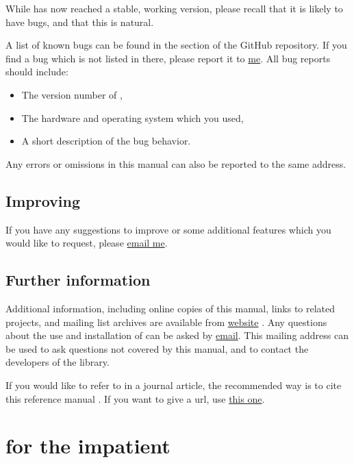 \documentclass{ol-softwaremanual}
\begin{document}
While \thel has now reached a stable, working version, please recall that it is likely to have bugs, and that this is natural. 

A list of known bugs can be found in the \issuesurl section of the GitHub repository.
If you find a bug which is not listed in there, please report it to \href{mailto:michele.castellana@gmail.com}{me}. All bug reports should include:
\begin{itemize}
    \item The version number of \thel, 
    \item The hardware and operating system which you used, 
    \item A short description of the bug behavior. 

\end{itemize}

Any errors or omissions in this manual can also be reported to the same address.

\subsection{Improving \thel}

If you have any suggestions to improve \thel or some additional features which you would like to request, please \href{\contactemail}{email me}. 

\subsection{Further information}


Additional information, including online copies of this manual, links to related projects, and mailing list archives are available from \thel \href{\thelemacusurl}{website}  .
Any questions about the use and installation of \thel can be asked by \href{\contactemail}{email}. This mailing address can be used to ask questions not covered by this manual, and to contact the developers of the library.

If you would like to refer to \thel in a journal article, the recommended way is to cite this reference manual \cite{castellana2024thelemacus-documentation}. If you want to give a url, use  \href{\thelemacusurl}{this one}. 


\section{\thel for the impatient}
\end{document}
